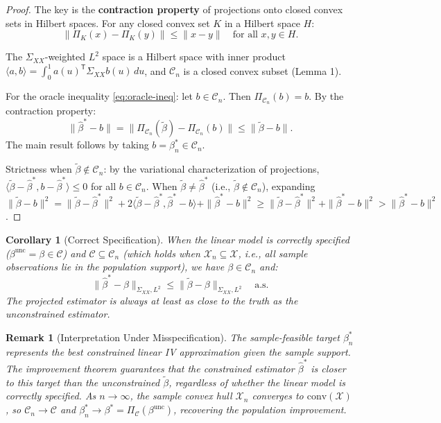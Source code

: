 \documentclass[12pt]{article}
\newcommand{\T}{\mathsf{T}}
\newtheorem{corollary}{Corollary}
\newtheorem{remark}{Remark}
\begin{document}
\begin{proof}
The key is the \textbf{contraction property} of projections onto closed convex sets in Hilbert spaces. For any closed convex set $K$ in a Hilbert space $H$:
\[
\|\Pi_K(x) - \Pi_K(y)\| \leq \|x - y\| \quad \text{for all } x, y \in H.
\]

The $\Sigma_{XX}$-weighted $L^2$ space is a Hilbert space with inner product $\langle a, b \rangle = \int_0^1 a(u)^\T \Sigma_{XX} b(u) \, du$, and $\mathcal{C}_n$ is a closed convex subset (Lemma 1).

For the oracle inequality \eqref{eq:oracle-ineq}: let $b \in \mathcal{C}_n$. Then $\Pi_{\mathcal{C}_n}(b) = b$. By the contraction property:
\[
\|\hat{\beta}^{*} - b\| = \|\Pi_{\mathcal{C}_n}(\tilde{\beta}) - \Pi_{\mathcal{C}_n}(b)\| \leq \|\tilde{\beta} - b\|.
\]
The main result follows by taking $b = \beta^*_n \in \mathcal{C}_n$.

Strictness when $\tilde{\beta} \notin \mathcal{C}_n$: by the variational characterization of projections, $\langle \tilde{\beta} - \hat{\beta}^*, b - \hat{\beta}^* \rangle \leq 0$ for all $b \in \mathcal{C}_n$. When $\tilde{\beta} \neq \hat{\beta}^*$ (i.e., $\tilde{\beta} \notin \mathcal{C}_n$), expanding $\|\tilde{\beta} - b\|^2 = \|\tilde{\beta} - \hat{\beta}^*\|^2 + 2\langle \tilde{\beta} - \hat{\beta}^*, \hat{\beta}^* - b\rangle + \|\hat{\beta}^* - b\|^2 \geq \|\tilde{\beta} - \hat{\beta}^*\|^2 + \|\hat{\beta}^* - b\|^2 > \|\hat{\beta}^* - b\|^2$.
\end{proof}

\begin{corollary}[Correct Specification]\label{cor:correct-spec}
When the linear model is correctly specified ($\beta^{\text{unc}} = \beta \in \mathcal{C}$) and $\mathcal{C} \subseteq \mathcal{C}_n$ (which holds when $\mathcal{X}_n \subseteq \mathcal{X}$, i.e., all sample observations lie in the population support), we have $\beta \in \mathcal{C}_n$ and:
\begin{equation}
\|\hat{\beta}^{*} - \beta\|_{\Sigma_{XX}, L^2} \leq \|\tilde{\beta} - \beta\|_{\Sigma_{XX}, L^2} \quad \text{a.s.}
\end{equation}
The projected estimator is always at least as close to the truth as the unconstrained estimator.
\end{corollary}

\begin{remark}[Interpretation Under Misspecification]
The sample-feasible target $\beta^*_n$ represents the best constrained linear IV approximation given the sample support. The improvement theorem guarantees that the constrained estimator $\hat{\beta}^*$ is closer to this target than the unconstrained $\tilde{\beta}$, regardless of whether the linear model is correctly specified. As $n \to \infty$, the sample convex hull $\mathcal{X}_n$ converges to $\text{conv}(\mathcal{X})$, so $\mathcal{C}_n \to \mathcal{C}$ and $\beta^*_n \to \beta^* = \Pi_{\mathcal{C}}(\beta^{\text{unc}})$, recovering the population improvement.
\end{remark}
\end{document}
